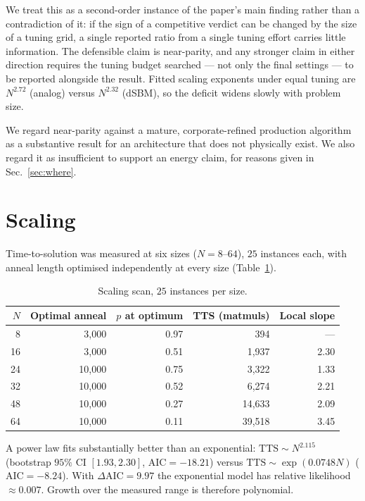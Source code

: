 \documentclass[11pt]{article}
\begin{document}
We treat this as a second-order instance of the paper's main finding rather
than a contradiction of it: if the sign of a competitive verdict can be changed
by the size of a tuning grid, a single reported ratio from a single tuning
effort carries little information. The defensible claim is near-parity, and any
stronger claim in either direction requires the tuning budget searched --- not
only the final settings --- to be reported alongside the result. Fitted scaling
exponents under equal tuning are $N^{2.72}$ (analog) versus $N^{2.32}$ (dSBM),
so the deficit widens slowly with problem size.

We regard near-parity against a mature, corporate-refined production algorithm as
a substantive result for an architecture that does not physically exist. We also
regard it as insufficient to support an energy claim, for reasons given in
Sec.~\ref{sec:where}.

\section{Scaling}
\label{sec:scaling}

Time-to-solution was measured at six sizes ($N=8$--$64$), $25$ instances each,
with anneal length optimised independently at every size
(Table~\ref{tab:scaling}).

\begin{table}[h]
\centering
\begin{tabular}{rrrrr}
\toprule
$N$ & Optimal anneal & $p$ at optimum & TTS (matmuls) & Local slope \\
\midrule
8  & 3{,}000  & 0.97 & 394    & --- \\
16 & 3{,}000  & 0.51 & 1{,}937  & 2.30 \\
24 & 10{,}000 & 0.75 & 3{,}322  & 1.33 \\
32 & 10{,}000 & 0.52 & 6{,}274  & 2.21 \\
48 & 10{,}000 & 0.27 & 14{,}633 & 2.09 \\
64 & 10{,}000 & 0.11 & 39{,}518 & 3.45 \\
\bottomrule
\end{tabular}
\caption{Scaling scan, $25$ instances per size.}
\label{tab:scaling}
\end{table}

A power law fits substantially better than an exponential:
$\mathrm{TTS}\sim N^{2.115}$ (bootstrap $95\%$ CI $[1.93,2.30]$,
$\mathrm{AIC}=-18.21$) versus $\mathrm{TTS}\sim\exp(0.0748N)$
($\mathrm{AIC}=-8.24$). With $\Delta\mathrm{AIC}=9.97$ the exponential model has
relative likelihood $\approx 0.007$. Growth over the measured range is therefore
polynomial.
\end{document}
